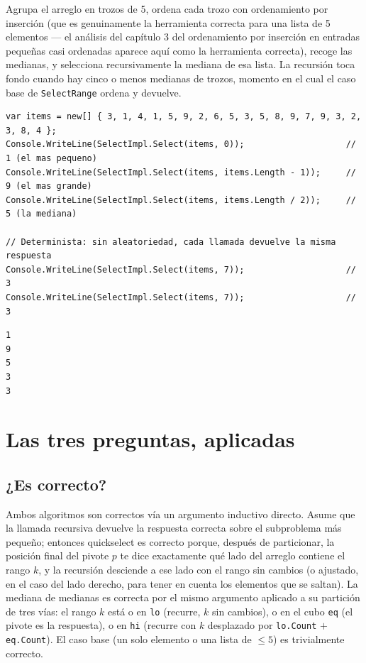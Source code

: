 \documentclass[11pt,a4paper]{article}
\begin{document}
Agrupa el arreglo en trozos de 5, ordena cada trozo con ordenamiento por inserción (que es genuinamente la herramienta correcta para una lista de 5 elementos --- el análisis del capítulo 3 del ordenamiento por inserción en entradas pequeñas casi ordenadas aparece aquí como la herramienta correcta), recoge las medianas, y selecciona recursivamente la mediana de esa lista. La recursión toca fondo cuando hay cinco o menos medianas de trozos, momento en el cual el caso base de \texttt{SelectRange} ordena y devuelve.

\begin{lstlisting}
var items = new[] { 3, 1, 4, 1, 5, 9, 2, 6, 5, 3, 5, 8, 9, 7, 9, 3, 2, 3, 8, 4 };
Console.WriteLine(SelectImpl.Select(items, 0));                    // 1 (el mas pequeno)
Console.WriteLine(SelectImpl.Select(items, items.Length - 1));     // 9 (el mas grande)
Console.WriteLine(SelectImpl.Select(items, items.Length / 2));     // 5 (la mediana)

// Determinista: sin aleatoriedad, cada llamada devuelve la misma respuesta
Console.WriteLine(SelectImpl.Select(items, 7));                    // 3
Console.WriteLine(SelectImpl.Select(items, 7));                    // 3
\end{lstlisting}

\begin{verbatim}
1
9
5
3
3
\end{verbatim}

\section{Las tres preguntas, aplicadas}

\subsection*{¿Es correcto?}

Ambos algoritmos son correctos vía un argumento inductivo directo. Asume que la llamada recursiva devuelve la respuesta correcta sobre el subproblema más pequeño; entonces quickselect es correcto porque, después de particionar, la posición final del pivote $p$ te dice exactamente qué lado del arreglo contiene el rango $k$, y la recursión desciende a ese lado con el rango sin cambios (o ajustado, en el caso del lado derecho, para tener en cuenta los elementos que se saltan). La mediana de medianas es correcta por el mismo argumento aplicado a su partición de tres vías: el rango $k$ está o en \texttt{lo} (recurre, $k$ sin cambios), o en el cubo \texttt{eq} (el pivote es la respuesta), o en \texttt{hi} (recurre con $k$ desplazado por \texttt{lo.Count} $+$ \texttt{eq.Count}). El caso base (un solo elemento o una lista de $\le 5$) es trivialmente correcto.
\end{document}
